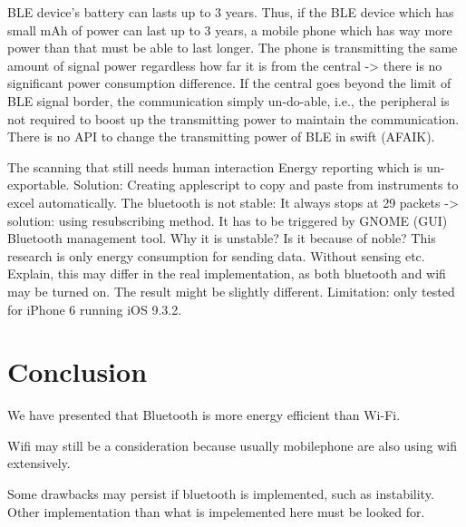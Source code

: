 \documentclass[journal]{vgtc}                %
\begin{document}
BLE device's battery can lasts up to 3 years. Thus, if the BLE device which has small mAh of power can last up to 3 years, a mobile phone which has way more power than that must be able to last longer.
The phone is transmitting the same amount of signal power regardless how far it is from the central -> there is no significant power consumption difference. If the central goes beyond the limit of BLE signal border, the communication simply un-do-able, i.e., the peripheral is not required to boost up the transmitting power to maintain the communication.
There is no API to change the transmitting power of BLE in swift (AFAIK).


The scanning that still needs human interaction
Energy reporting which is un-exportable.
Solution: Creating applescript to copy and paste from instruments to excel automatically.
The bluetooth is not stable:
It always stops at 29 packets -> solution: using resubscribing method.
It has to be triggered by GNOME (GUI) Bluetooth management tool.
Why it is unstable?
Is it because of noble?
This research is only energy consumption for sending data. Without sensing etc.
Explain, this may differ in the real implementation, as both bluetooth and wifi may be turned on. The result might be slightly different.
Limitation: only tested for iPhone 6 running iOS 9.3.2.

\section{Conclusion} %
\label{sec:conclusion}
We have presented that Bluetooth is more energy efficient than Wi-Fi.

Wifi may still be a consideration because usually mobilephone are also using wifi extensively.

Some drawbacks may persist if bluetooth is implemented, such as instability. Other implementation than what is impelemented here must be looked for.



%

%
%
%

\end{document}

